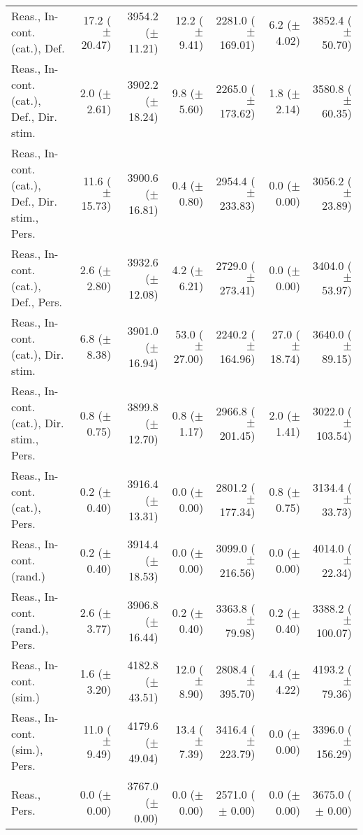 \begin{table*}
\begin{tabular}{lrrrrrr}
        Reas., In-cont. (cat.), Def. & 17.2 ($\pm$ 20.47) & 3954.2 ($\pm$ 11.21) & 12.2 ($\pm$ 9.41) & 2281.0 ($\pm$ 169.01) & 6.2 ($\pm$ 4.02) & 3852.4 ($\pm$ 50.70) \\
        Reas., In-cont. (cat.), Def., Dir. stim. & 2.0 ($\pm$ 2.61) & 3902.2 ($\pm$ 18.24) & 9.8 ($\pm$ 5.60) & 2265.0 ($\pm$ 173.62) & 1.8 ($\pm$ 2.14) & 3580.8 ($\pm$ 60.35) \\
        Reas., In-cont. (cat.), Def., Dir. stim., Pers. & 11.6 ($\pm$ 15.73) & 3900.6 ($\pm$ 16.81) & 0.4 ($\pm$ 0.80) & 2954.4 ($\pm$ 233.83) & 0.0 ($\pm$ 0.00) & 3056.2 ($\pm$ 23.89) \\
        Reas., In-cont. (cat.), Def., Pers. & 2.6 ($\pm$ 2.80) & 3932.6 ($\pm$ 12.08) & 4.2 ($\pm$ 6.21) & 2729.0 ($\pm$ 273.41) & 0.0 ($\pm$ 0.00) & 3404.0 ($\pm$ 53.97) \\
        Reas., In-cont. (cat.), Dir. stim. & 6.8 ($\pm$ 8.38) & 3901.0 ($\pm$ 16.94) & 53.0 ($\pm$ 27.00) & 2240.2 ($\pm$ 164.96) & 27.0 ($\pm$ 18.74) & 3640.0 ($\pm$ 89.15) \\
        Reas., In-cont. (cat.), Dir. stim., Pers. & 0.8 ($\pm$ 0.75) & 3899.8 ($\pm$ 12.70) & 0.8 ($\pm$ 1.17) & 2966.8 ($\pm$ 201.45) & 2.0 ($\pm$ 1.41) & 3022.0 ($\pm$ 103.54) \\
        Reas., In-cont. (cat.), Pers. & 0.2 ($\pm$ 0.40) & 3916.4 ($\pm$ 13.31) & 0.0 ($\pm$ 0.00) & 2801.2 ($\pm$ 177.34) & 0.8 ($\pm$ 0.75) & 3134.4 ($\pm$ 33.73) \\
        Reas., In-cont. (rand.) & 0.2 ($\pm$ 0.40) & 3914.4 ($\pm$ 18.53) & 0.0 ($\pm$ 0.00) & 3099.0 ($\pm$ 216.56) & 0.0 ($\pm$ 0.00) & 4014.0 ($\pm$ 22.34) \\
        Reas., In-cont. (rand.), Pers. & 2.6 ($\pm$ 3.77) & 3906.8 ($\pm$ 16.44) & 0.2 ($\pm$ 0.40) & 3363.8 ($\pm$ 79.98) & 0.2 ($\pm$ 0.40) & 3388.2 ($\pm$ 100.07) \\
        Reas., In-cont. (sim.) & 1.6 ($\pm$ 3.20) & 4182.8 ($\pm$ 43.51) & 12.0 ($\pm$ 8.90) & 2808.4 ($\pm$ 395.70) & 4.4 ($\pm$ 4.22) & 4193.2 ($\pm$ 79.36) \\
        Reas., In-cont. (sim.), Pers. & 11.0 ($\pm$ 9.49) & 4179.6 ($\pm$ 49.04) & 13.4 ($\pm$ 7.39) & 3416.4 ($\pm$ 223.79) & 0.0 ($\pm$ 0.00) & 3396.0 ($\pm$ 156.29) \\
        Reas., Pers. & 0.0 ($\pm$ 0.00) & 3767.0 ($\pm$ 0.00) & 0.0 ($\pm$ 0.00) & 2571.0 ($\pm$ 0.00) & 0.0 ($\pm$ 0.00) & 3675.0 ($\pm$ 0.00) \\
        \bottomrule
    \end{tabular}


\end{table*}
